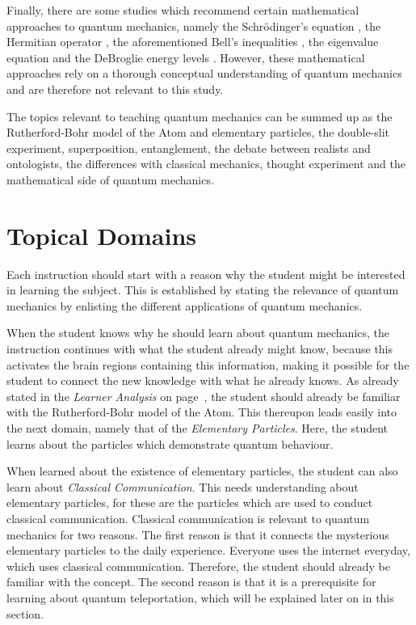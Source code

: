 \documentclass[11pt,twoside]{report} %
\begin{document}
Finally, there are some studies which recommend certain mathematical approaches to quantum mechanics, namely the Schrödinger's equation \cite{muller, singh2}, the Hermitian operator \cite{singh2}, the aforementioned Bell's inequalities \cite{kuttner, muller}, the eigenvalue equation \cite{muller} and the DeBroglie energy levels \cite{dori, gianino, mckagan}. However, these mathematical approaches rely on a thorough conceptual understanding of quantum mechanics and are therefore not relevant to this study.

The topics relevant to teaching quantum mechanics can be summed up as the Rutherford-Bohr model of the Atom and elementary particles, the double-slit experiment, superposition, entanglement, the debate between realists and ontologists, the differences with classical mechanics, thought experiment and the mathematical side of quantum mechanics.

\chapter{Topical Domains}
\label{app:topicaldomains}

Each instruction should start with a reason why the student might be interested in learning the subject. This is established by stating the relevance of quantum mechanics by enlisting the different applications of quantum mechanics.

When the student knows why he should learn about quantum mechanics, the instruction continues with what the student already might know, because this activates the brain regions containing this information, making it possible for the student to connect the new knowledge with what he already knows. As already stated in the \emph{Learner Analysis} on page~\pageref{ch:learneranalysis}, the student should already be familiar with the Rutherford-Bohr model of the Atom. This thereupon leads easily into the next domain, namely that of the \emph{Elementary Particles}. Here, the student learns about the particles which demonstrate quantum behaviour.

When learned about the existence of elementary particles, the student can also learn about \emph{Classical Communication}. This needs understanding about elementary particles, for these are the particles which are used to conduct classical communication. Classical communication is relevant to quantum mechanics for two reasons. The first reason is that it connects the mysterious elementary particles to the daily experience. Everyone uses the internet everyday, which uses classical communication. Therefore, the student should already be familiar with the concept. The second reason is that it is a prerequisite for learning about quantum teleportation, which will be explained later on in this section.
\end{document}
